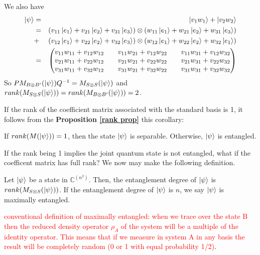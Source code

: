 \begin{example}

We also have
\begin{eqnarray*}
\ket{\psi}&=&\ket{v_1 w_1}+\ket{v_2 w_2}\\
&=& (v_{11}\ket{e_1}+v_{21}\ket{e_2}+v_{31}\ket{e_3}) \otimes (w_{11}\ket{e_1}+w_{21}\ket{e_2}+w_{31}\ket{e_3}) \\
&+& (v_{12}\ket{e_1}+v_{22}\ket{e_2}+v_{32}\ket{e_3}) \otimes (w_{12}\ket{e_1}+w_{22}\ket{e_2}+w_{32}\ket{e_1})\\
&=&\begin{pmatrix}
v_{11}w_{11}+v_{12}w_{12} && v_{11}w_{21}+v_{12}w_{22} && v_{11}w_{31}+v_{12}w_{32}\\
v_{21}w_{11}+v_{22}w_{12} && v_{21}w_{21}+v_{22}w_{22} && v_{21}w_{31}+v_{22}w_{32} \\
v_{31}w_{11}+v_{32}w_{12} && v_{31}w_{21}+v_{32}w_{22} && v_{31}w_{31}+v_{32}w_{32} 
\end{pmatrix}
\end{eqnarray*}
So $PM_{B \otimes B'}(\ket{\psi})Q^{-1}=M_{S \otimes S}(\ket{\psi})$ and $rank(M_{S \otimes S}(\ket{\psi}))=rank(M_{B \otimes B'}(\ket{\psi}))=2$.
\end{example}

\bigskip
If the rank of the coefficient matrix associated with the standard basis is 1, it follows from the \textbf{Proposition \ref{rank prop}} this corollary:

\begin{corollary}
If $rank(M(\ket{\psi}))=1$, then the state $\ket{\psi}$ is separable. Otherwise, $\ket{\psi}$ is entangled.
\end{corollary}

If the rank being 1 implies the joint quantum state is not entangled, what if the coefficent matrix has full rank? We now may make the following definition.
\begin{definition}
 Let $\ket{\psi}$ be  a state in ${\mathbb{C}}^{(n^2)}$.  Then, the entanglement degree of $\ket{\psi}$ is $rank(M_{S \otimes S}(\ket{\psi}))$.  If the entanglement degree of $\ket{\psi}$ is $n$, we say $\ket{\psi}$ is maximally entangled.
\end{definition}

\textcolor{red}{conventional definition of maximally entangled: when we trace over the state B then the reduced density operator $\rho_A$ of the system will be a multiple of the identity operator. This means that if we measure in system A in any basis the result will be completely random (0 or 1 with equal probability 1/2)}.



